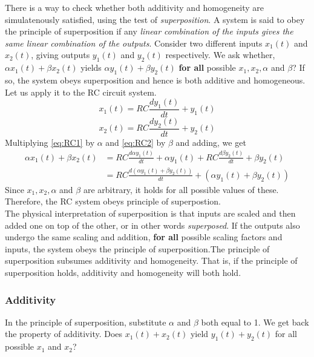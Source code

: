 There is a way to check whether both additivity and homogeneity are simulatenously satisfied, using the test of \textit{superposition}.
A system is said to obey the principle of superposition if any \textit{linear combination of the inputs gives the same linear combination of the outputs}. Consider two different inputs $x_{1}(t)$ and $x_{2}(t)$, giving outputs $y_{1}(t)$ and $y_{2}(t)$ respectively. We ask whether, $\alpha x_{1}(t) + \beta x_{2}(t)$ yields $\alpha y_{1}(t) + \beta y_{2}(t)$ {\bf for all} possible $x_{1}, x_{2}, \alpha$ and $\beta$? If so, the system obeys superposition and hence is both additive and homogeneous. Let us apply it to the RC circuit system. 
\begin{equation}\label{eq:RC1}
x_{1}(t) = RC\frac{dy_{1}(t)}{dt} + y_{1}(t)
\end{equation}
\begin{equation}\label{eq:RC2}
x_{2}(t) = RC\frac{dy_{2}(t)}{dt} + y_{2}(t) 
\end{equation}
Multiplying \eqref{eq:RC1} by $\alpha$ and \eqref{eq:RC2} by $\beta$ and adding, we get
\begin{equation}
\begin{split}
\alpha x_{1}(t) + \beta x_{2}(t) & = RC\frac{d\alpha y_{1}(t)}{dt} + \alpha y_{1}(t) + RC\frac{d\beta y_{2}(t)}{dt} + \beta y_{2}(t) \\
& = RC\frac{d (\alpha y_{1}(t) + \beta y_{2}(t))}{dt} + (\alpha y_{1}(t) + \beta y_{2}(t))
\end{split}
\end{equation}
Since $x_{1}, x_{2}, \alpha$ and $\beta$ are arbitrary, it holds for all possible values of these. Therefore, the RC system obeys principle of superpostion. 
\\

The physical interpretation of superposition is that inputs are scaled and then added one on top of the other, or in other words \textit{superposed}. If the outputs also undergo the same scaling and addition, {\bf for all} possible scaling factors and inputs, the system obeys the principle of superposition.The principle of superposition subsumes additivity and homogeneity. That is, if the principle of superposition holds, additivity and homogeneity will both hold.

\subsubsection*{Additivity} In the principle of superposition, substitute $\alpha$ and $\beta$ both equal to 1. We get back the property of additivity. Does $x_{1}(t) + x_{2}(t)$ yield $y_{1}(t) + y_{2}(t)$ for all possible $x_{1}$ and $x_{2}$?

